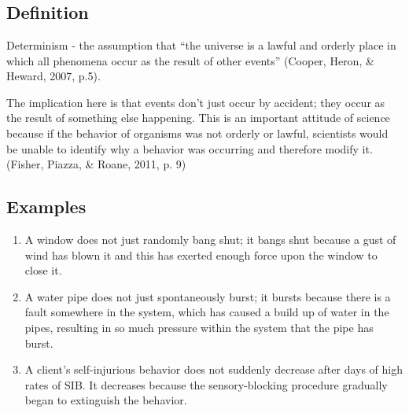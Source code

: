 \clearpage \section{\fourFKThree{}}
\subsection{Definition}
Determinism - the assumption that ``the universe is a lawful and orderly place in which all phenomena occur as the result of other events'' (Cooper, Heron, \& Heward, 2007, p.5).

The implication here is that events don't just occur by accident; they occur as the result of something else happening. This is an important attitude of science because if the behavior of organisms was not orderly or lawful, scientists would be unable to identify why a behavior was occurring and therefore modify it. (Fisher, Piazza, \& Roane, 2011, p. 9) 

\subsection{Examples}
\begin{enumerate}
\item A window does not just randomly bang shut; it bangs shut because a gust of wind has blown it and this has exerted enough force upon the window to close it. 
\item A water pipe does not just spontaneously burst; it bursts because there is a fault somewhere in the system, which has caused a build up of water in the pipes, resulting in so much pressure within the system that the pipe has burst.
\item A client's self-injurious behavior does not suddenly decrease after days of high rates of SIB. It decreases because the sensory-blocking procedure gradually began to extinguish the behavior.
%
\end{enumerate}
%
